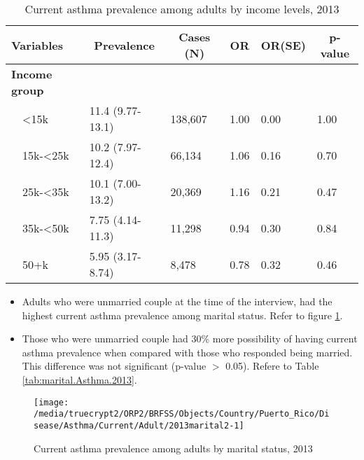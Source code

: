 \begin{table}[H]
\caption{Current asthma prevalence  among adults by income levels, 2013\label{tab:income.Asthma.2013}} 
\begin{center}
\begin{tabular}{llllll}
\hline\hline
\multicolumn{1}{l}{Variables}&\multicolumn{1}{c}{Prevalence}&\multicolumn{1}{c}{Cases (N)}&\multicolumn{1}{c}{OR}&\multicolumn{1}{c}{OR(SE)}&\multicolumn{1}{c}{p-value}\tabularnewline
\hline
{\bfseries Income group}&&&&&\tabularnewline
~~\textless15k&11.4 (9.77-13.1)&138,607&1.00&0.00&1.00\tabularnewline
~~15k-\textless25k&10.2 (7.97-12.4)& 66,134&1.06&0.16&0.70\tabularnewline
~~25k-\textless35k&10.1 (7.00-13.2)& 20,369&1.16&0.21&0.47\tabularnewline
~~35k-\textless50k&7.75 (4.14-11.3)& 11,298&0.94&0.30&0.84\tabularnewline
~~50+k&5.95 (3.17-8.74)&  8,478&0.78&0.32&0.46\tabularnewline
\hline
\end{tabular}\end{center}

\end{table}

 \newpage
\begin{itemize}

\item Adults who were 
unmarried couple at the time of the interview, had the highest current asthma prevalence among marital status. Refer to figure \ref{fig:marital.Asthma.2013}.

\item Those who were unmarried couple had 30\% more possibility of having current asthma prevalence when compared with those who responded being married. This difference was not significant (p-value $>$ 0.05). Refere to Table \ref{tab:marital.Asthma.2013}.

\end{itemize}

\begin{figure}[H]
\caption{Current asthma prevalence among adults by marital status,
         2013}
\label{fig:marital.Asthma.2013}
\begin{knitrout}
\color{fgcolor}

{\centering \texttt{[image: /media/truecrypt2/ORP2/BRFSS/Objects/Country/Puerto\_Rico/Disease/Asthma/Current/Adult/2013marital2-1]} 

}



\end{knitrout}
 \end{figure}

